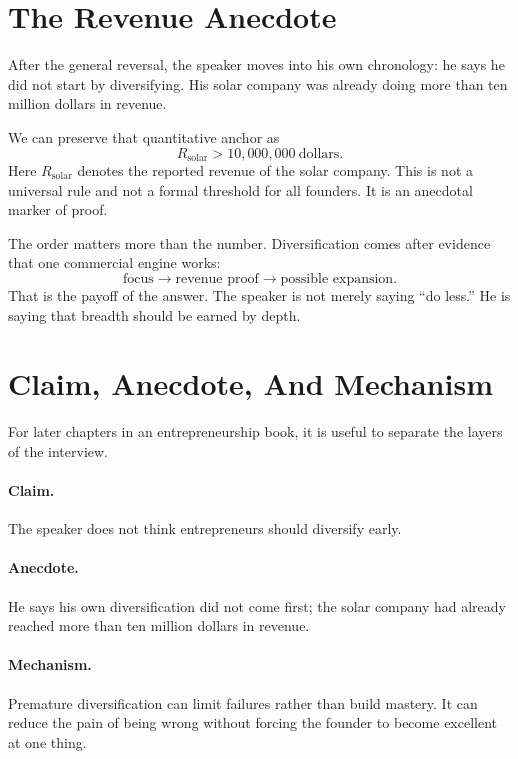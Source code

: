 \section{The Revenue Anecdote}

After the general reversal, the speaker moves into his own chronology: he says he did not start by diversifying. His solar company was already doing more than ten million dollars in revenue.

We can preserve that quantitative anchor as
\begin{equation}
R_{\mathrm{solar}} > 10{,}000{,}000 \ \text{dollars}.
\end{equation}
Here \(R_{\mathrm{solar}}\) denotes the reported revenue of the solar company. This is not a universal rule and not a formal threshold for all founders. It is an anecdotal marker of proof.

The order matters more than the number. Diversification comes after evidence that one commercial engine works:
\begin{equation}
\text{focus}
\longrightarrow
\text{revenue proof}
\longrightarrow
\text{possible expansion}.
\end{equation}
That is the payoff of the answer. The speaker is not merely saying ``do less.'' He is saying that breadth should be earned by depth.

\section{Claim, Anecdote, And Mechanism}

For later chapters in an entrepreneurship book, it is useful to separate the layers of the interview.

\paragraph{Claim.}
The speaker does not think entrepreneurs should diversify early.

\paragraph{Anecdote.}
He says his own diversification did not come first; the solar company had already reached more than ten million dollars in revenue.

\paragraph{Mechanism.}
Premature diversification can limit failures rather than build mastery. It can reduce the pain of being wrong without forcing the founder to become excellent at one thing.

